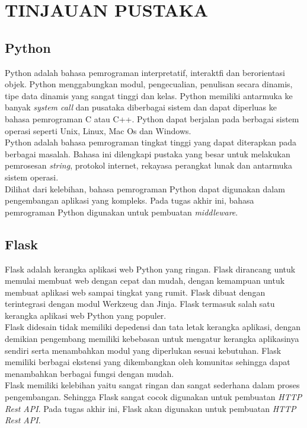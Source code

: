 \chapter{TINJAUAN PUSTAKA}
		\section{Python}
        		Python adalah bahasa pemrograman interpretatif, interaktfi dan berorientasi objek. Python menggabungkan modul, pengecualian, penulisan secara dinamis, tipe data dinamis yang sangat tinggi dan kelas. Python memiliki antarmuka ke banyak \textit{system call} dan pusataka diberbagai sistem dan dapat diperluas ke bahasa pemrograman C atau C++. Python dapat berjalan pada berbagai sistem operasi seperti Unix, Linux, Mac Os dan Windows.\\
                \indent Python adalah bahasa pemrograman tingkat tinggi yang dapat diterapkan pada berbagai masalah. Bahasa ini dilengkapi pustaka yang besar untuk melakukan pemrosesan \textit{string}, protokol internet, rekayasa perangkat lunak dan antarmuka sistem operasi\cite{python_faq}.\\
                \indent Dilihat dari kelebihan, bahasa pemrograman Python dapat digunakan dalam pengembangan aplikasi yang kompleks. Pada tugas akhir ini, bahasa pemrograman Python digunakan untuk pembuatan \textit{middleware}.
        \section{Flask}
         	Flask adalah kerangka aplikasi web Python yang ringan. Flask dirancang untuk memulai membuat web dengan cepat dan mudah, dengan kemampuan untuk membuat aplikasi web sampai tingkat yang rumit. Flask dibuat dengan terintegrasi dengan modul Werkzeug dan Jinja. Flask termasuk salah satu kerangka aplikasi web Python yang populer.\\
            \indent Flask didesain tidak memiliki depedensi dan tata letak kerangka aplikasi, dengan demikian pengembang memiliki kebebasan untuk mengatur kerangka aplikasinya sendiri serta menambahkan modul yang diperlukan sesuai kebutuhan. Flask memiliki berbagai ekstensi yang dikembangkan oleh komunitas sehingga dapat menambahkan berbagai fungsi dengan mudah\cite{about_flask}. \\
            \indent Flask memiliki kelebihan yaitu sangat ringan dan sangat sederhana dalam proses pengembangan. Sehingga Flask sangat cocok digunakan untuk pembuatan \textit{HTTP Rest API}. Pada tugas akhir ini, Flask akan digunakan untuk pembuatan \textit{HTTP Rest API}.
        
